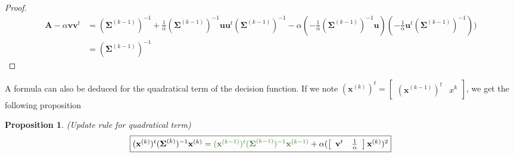 \documentclass[a4paper,11pt,DIV=16,abstracton]{scrartcl}
\newtheorem{prop}{Proposition}
\begin{document}
        \begin{proof}
            \begin{align*}
                \mathbf{A} - \alpha \mathbf{v} \mathbf{v}^t
                &= (\boldsymbol{\Sigma}^{(k-1)})^{-1} + \frac{1}{\alpha} (\boldsymbol{\Sigma}^{(k-1)})^{-1} \mathbf{u} \mathbf{u}^t (\boldsymbol{\Sigma}^{(k-1)})^{-1} - \alpha (- \frac{1}{\alpha} (\boldsymbol{\Sigma}^{(k-1)})^{-1} \mathbf{u}) (- \frac{1}{\alpha} \mathbf{u}^t (\boldsymbol{\Sigma}^{(k-1)})^{-1})) \\
                &= (\boldsymbol{\Sigma}^{(k-1)})^{-1}
            \end{align*}
        \end{proof}

        A formula can also be deduced for the quadratical term of the decision function. If we note $(\mathbf{x}^{(k)})^t = \left[\begin{array}{cc} (\mathbf{x}^{(k-1)})^t   & x^k \end{array}\right]$, we get the following proposition
        \begin{prop}
        \label{eq:update-quad}
            (Update rule for quadratical term)
            \begin{equation*}
                \fbox{$(\mathbf{x}^{(k)})^t (\boldsymbol{\Sigma}^{(k)})^{-1} \mathbf{x}^{(k)} = \textcolor{OliveGreen}{(\mathbf{x}^{(k-1)})^t (\boldsymbol{\Sigma}^{(k-1)})^{-1} \mathbf{x}^{(k-1)}} + \alpha ( \left[\begin{array}{cc} \mathbf{v}^t & \frac{1}{\alpha} \end{array}\right] \mathbf{x}^{(k)} )^2$}
            \end{equation*}
        \end{prop}
\end{document}
